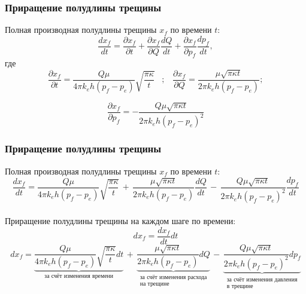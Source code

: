\documentclass{beamer}
\begin{document}
\begin{frame}
\frametitle{Приращение полудлины трещины}

Полная производная полудлины трещины $x_{\!f}$ по времени $t$:
$$
\frac{dx_{\!f}}{dt}=\frac{\partial x_{\!f}}{\partial t}+\frac{\partial x_{\!f}}{\partial Q}\frac{dQ}{dt}+\frac{\partial x_{\!f}}{\partial p_{\!f}}\frac{dp_{\!f}}{dt},
$$
где
$$
\frac{\partial x_{\!f}}{\partial t}=\frac{Q\mu}{4\pi k_eh\left(p_{\!f}-p_e\right)}\sqrt{\frac{\pi\kappa}{t}}\,\,\,\,\,;\,\,\,\,\,\frac{\partial x_{\!f}}{\partial Q}=\frac{\mu\sqrt{\pi\kappa t}}{2\pi k_eh\left(p_{\!f}-p_e\right)};
$$

$$
\frac{\partial x_{\!f}}{\partial p_{\!f}}=-\frac{Q\mu\sqrt{\pi\kappa t}}{2\pi k_eh\left(p_{\!f}-p_e\right)^2}
$$
\end{frame}


\begin{frame}
\frametitle{Приращение полудлины трещины}

Полная производная полудлины трещины $x_{\!f}$ по времени $t$:
\small
$$
\frac{dx_{\!f}}{dt}=\frac{Q\mu}{4\pi k_eh\left(p_{\!f}-p_e\right)}\sqrt{\frac{\pi\kappa}{t}}\,+\,\frac{\mu\sqrt{\pi\kappa t}}{2\pi k_eh\left(p_{\!f}-p_e\right)}\frac{dQ}{dt}\,-\,\frac{Q\mu\sqrt{\pi\kappa t}}{2\pi k_eh\left(p_{\!f}-p_e\right)^2}\frac{dp_{\!f}}{dt}
$$
\normalsize
\ \\

Приращение полудлины трещины на каждом шаге по времени:
$$
dx_{\!f}=\frac{dx_{\!f}}{dt}dt
$$
\small
$$
dx_{\!f}=\underbrace{\frac{Q\mu}{4\pi k_eh\left(p_{\!f}-p_e\right)}\sqrt{\frac{\pi\kappa}{t}}dt}_{\text{за счёт изменения времени}}\,+\,\underbrace{\frac{\mu\sqrt{\pi\kappa t}}{2\pi k_eh\left(p_{\!f}-p_e\right)}dQ}_{\substack{\text{за счёт изменения расхода}\\\text{на трещине}}}\,-\,\underbrace{\frac{Q\mu\sqrt{\pi\kappa t}}{2\pi k_eh\left(p_{\!f}-p_e\right)^2}dp_{\!f}}_{\substack{\text{за счёт изменения давления}\\\text{в трещине}}}
$$
\normalsize

\end{frame}
\end{document}
